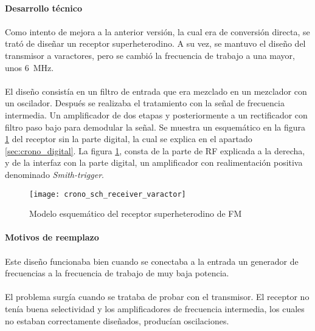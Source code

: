 \paragraph{Desarrollo técnico}
\paragraph{}
Como intento de mejora a la anterior versión, la cual era de conversión directa, se trató de diseñar un receptor superheterodino. A su vez, se mantuvo el diseño del transmisor a varactores, pero se cambió la frecuencia de trabajo a una mayor, unos \SI{6}{\mega\hertz}. 
\paragraph{}
El diseño consistía en un filtro de entrada que era mezclado en un mezclador con un oscilador. Después se realizaba el tratamiento con la señal de frecuencia intermedia. Un amplificador de dos etapas y posteriormente a un rectificador con filtro paso bajo para demodular la señal. Se muestra un esquemático en la figura \ref{fig:crono_sch_receiver_varactor} del receptor sin la parte digital, la cual se explica en el apartado \ref{sec:crono_digital}. La figura \ref{fig:crono_sch_receiver_varactor}, consta de la parte de RF explicada a la derecha, y de la interfaz con la parte digital, un amplificador con realimentaci\'on positiva denominado \textit{Smith-trigger}.

\begin{figure}[h!]
    \centering
    \texttt{[image: crono\_sch\_receiver\_varactor]}
    \caption{Modelo esquem\'atico del receptor superheterodino de FM}
    \label{fig:crono_sch_receiver_varactor}
\end{figure}

\paragraph{Motivos de reemplazo}
\paragraph{}
Este diseño funcionaba bien cuando se conectaba a la entrada un generador de frecuencias a la frecuencia de trabajo de muy baja potencia.
\paragraph{}
El problema surgía cuando se trataba de probar con el transmisor. 
El receptor no tenía buena selectividad y los amplificadores de frecuencia intermedia, los cuales no estaban correctamente diseñados, producían oscilaciones.
